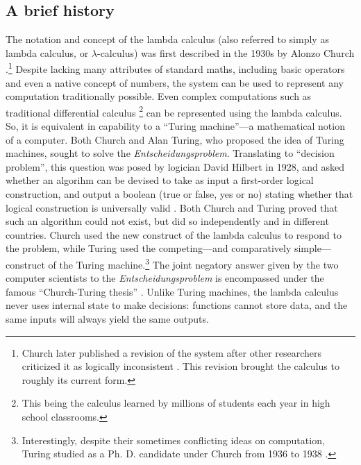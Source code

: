 \documentclass[twocolumn,titlepage,12pt]{article}
\begin{document}
\subsection{A brief history}
The notation and concept of the lambda calculus (also referred to simply as lambda calculus, or $\lambda$-calculus) was first described in the 1930s by Alonzo Church \cite{church}.\footnote{Church later published a revision \cite{church2} of the system after other researchers criticized it as logically inconsistent \cite{logicallyinconsistent}. This revision brought the calculus to roughly its current form.} Despite lacking many attributes of standard maths, including basic operators and even a native concept of numbers, the system can be used to represent any computation traditionally possible. Even complex computations such as traditional differential calculus \cite{differentiallc}\footnote{This being the calculus learned by millions of students each year in high school classrooms.} can be represented using the lambda calculus. So, it is equivalent in capability to a ``Turing machine''---a mathematical notion of a computer. Both Church and Alan Turing, who proposed the idea of Turing machines, sought to solve the \textit{Entscheidungsproblem}. Translating to ``decision problem'', this question was posed by logician David Hilbert in 1928, and asked whether an algorihm can be devised to take as input a first-order logical construction, and output a boolean (true or false, yes or no) stating whether that logical construction is universally valid \cite{hilbert}. Both Church and Turing proved that such an algorithm could not exist, but did so independently and in different countries. Church used the new construct of the lambda calculus to respond to the problem, while Turing used the competing---and comparatively simple---construct of the Turing machine.\footnote{Interestingly, despite their sometimes conflicting ideas on computation, Turing studied as a Ph. D. candidate under Church from 1936 to 1938 \cite{churchpapers}.} The joint negatory answer given by the two computer scientists to the \textit{Entscheidungsproblem} is encompassed under the famous ``Church-Turing thesis'' \cite{churchturingthesis}. Unlike Turing machines, the lambda calculus never uses internal state to make decisions: functions cannot store data, and the same inputs will always yield the same outputs.
\end{document}
